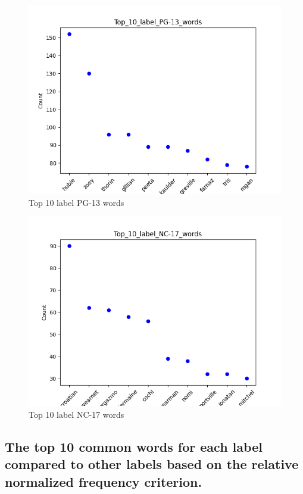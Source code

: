 \documentclass[a4paper]{article}
\begin{document}
\begin{figure}[ht]
    \centering
    \includegraphics[width=1\textwidth]{../stats/Top_10_label_PG-13_words.png}
    \caption{Top 10 label PG-13 words}
\end{figure}

\begin{figure}[ht]
    \centering
    \includegraphics[width=1\textwidth]{../stats/Top_10_label_NC-17_words.png}
    \caption{Top 10 label NC-17 words}
\end{figure}

\FloatBarrier

\subsection*{The top 10 common words for each label compared to other labels based on the relative normalized frequency criterion.}
\end{document}
